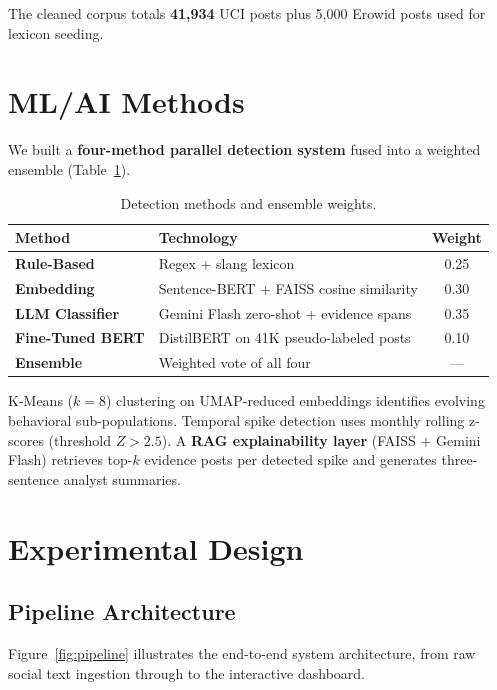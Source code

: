 \documentclass[10pt,twocolumn]{article}
\begin{document}
The cleaned corpus totals \textbf{41,934} UCI posts plus 5,000 Erowid posts used for lexicon seeding.

\section{ML/AI Methods}

We built a \textbf{four-method parallel detection system} fused into a weighted ensemble (Table~\ref{tab:methods}).

\begin{table}[H]
\centering
\caption{Detection methods and ensemble weights.}
\label{tab:methods}
\scriptsize
\begin{tabularx}{\columnwidth}{@{}>{\bfseries}lXc@{}}
  \toprule
  Method & Technology & Weight \\
  \midrule
  Rule-Based        & Regex + slang lexicon & 0.25 \\
  Embedding         & Sentence-BERT + FAISS cosine similarity & 0.30 \\
  LLM Classifier    & Gemini Flash zero-shot + evidence spans & 0.35 \\
  Fine-Tuned BERT   & DistilBERT on 41K pseudo-labeled posts & 0.10 \\
  \midrule
  \textbf{Ensemble} & Weighted vote of all four & — \\
  \bottomrule
\end{tabularx}
\end{table}

K-Means ($k=8$) clustering on UMAP-reduced embeddings identifies evolving behavioral sub-populations.
Temporal spike detection uses monthly rolling z-scores (threshold $Z > 2.5$).
A \textbf{RAG explainability layer} (FAISS + Gemini Flash) retrieves top-$k$ evidence posts per detected spike
and generates three-sentence analyst summaries.

\section{Experimental Design}

\subsection*{Pipeline Architecture}

Figure~\ref{fig:pipeline} illustrates the end-to-end system architecture, from raw social text ingestion
through to the interactive dashboard.
\end{document}
